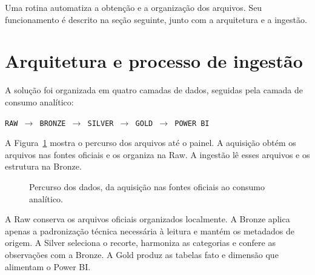Uma rotina automatiza a obtenção e a organização dos arquivos. Seu funcionamento é descrito na seção seguinte, junto com a arquitetura e a ingestão.

\section{Arquitetura e processo de ingestão}

A solução foi organizada em quatro camadas de dados, seguidas pela camada de consumo analítico:

\begin{center}
\texttt{RAW $\rightarrow$ BRONZE $\rightarrow$ SILVER $\rightarrow$ GOLD $\rightarrow$ POWER BI}
\end{center}

A Figura~\ref{fig:fluxo-aquisicao} mostra o percurso dos arquivos até o painel. A aquisição obtém os arquivos nas fontes oficiais e os organiza na Raw. A ingestão lê esses arquivos e os estrutura na Bronze.

\begin{figure}[htbp]
\centering
{}
\caption{Percurso dos dados, da aquisição nas fontes oficiais ao consumo analítico.}
\label{fig:fluxo-aquisicao}
\end{figure}

A Raw conserva os arquivos oficiais organizados localmente. A Bronze aplica apenas a padronização técnica necessária à leitura e mantém os metadados de origem. A Silver seleciona o recorte, harmoniza as categorias e confere as observações com a Bronze. A Gold produz as tabelas fato e dimensão que alimentam o Power BI.

